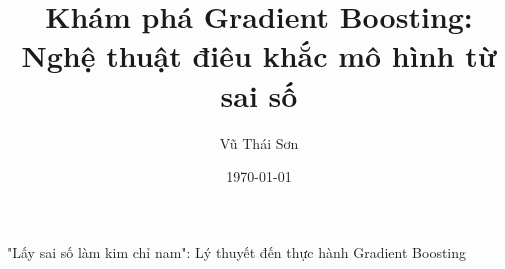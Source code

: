 \documentclass[12pt, a4paper]{article}
\begin{document}
\title{Khám phá Gradient Boosting: Nghệ thuật điêu khắc mô hình từ sai số}

\author{Vũ Thái Sơn}

\date{\today}

\maketitle

\begin{center}
\large "Lấy sai số làm kim chỉ nam": Lý thuyết đến thực hành Gradient Boosting
\end{center}

\newpage
\tableofcontents
\newpage





\end{document}

